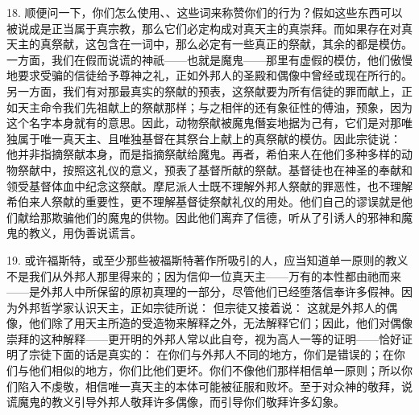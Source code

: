 18. 顺便问一下，你们怎么使用、、这些词来称赞你们的行为？假如这些东西可以被说成是正当属于真宗教，那么它们必定构成对真天主的真崇拜。而如果存在对真天主的真祭献，这包含在一词中，那么必定有一些真正的祭献，其余的都是模仿。一方面，我们在假而说谎的神祇——也就是魔鬼——那里有虚假的模仿，他们傲慢地要求受骗的信徒给予尊神之礼，正如外邦人的圣殿和偶像中曾经或现在所行的。另一方面，我们有对那最真实的祭献的预表，这祭献要为所有信徒的罪而献上，正如天主命令我们先祖献上的祭献那样；与之相伴的还有象征性的傅油，预象，因为这个名字本身就有的意思。因此，动物祭献被魔鬼僭妄地据为己有，它们是对那唯独属于唯一真天主、且唯独基督在其祭台上献上的真祭献的模仿。因此宗徒说：  他并非指摘祭献本身，而是指摘祭献给魔鬼。再者，希伯来人在他们多种多样的动物祭献中，按照这礼仪的意义，预表了基督所献的祭献。基督徒也在神圣的奉献和领受基督体血中纪念这祭献。摩尼派人士既不理解外邦人祭献的罪恶性，也不理解希伯来人祭献的重要性，更不理解基督徒祭献礼仪的用处。他们自己的谬误就是他们献给那欺骗他们的魔鬼的供物。因此他们离弃了信德，听从了引诱人的邪神和魔鬼的教义，用伪善说谎言。\par

19. 或许福斯特，或至少那些被福斯特著作所吸引的人，应当知道单一原则的教义不是我们从外邦人那里得来的；因为信仰一位真天主——万有的本性都由祂而来——是外邦人中所保留的原初真理的一部分，尽管他们已经堕落信奉许多假神。因为外邦哲学家认识天主，正如宗徒所说：  但宗徒又接着说：  这就是外邦人的偶像，他们除了用天主所造的受造物来解释之外，无法解释它们；因此，他们对偶像崇拜的这种解释——更开明的外邦人常以此自夸，视为高人一等的证明——恰好证明了宗徒下面的话是真实的： 在你们与外邦人不同的地方，你们是错误的；在你们与他们相似的地方，你们比他们更坏。你们不像他们那样相信单一原则；所以你们陷入不虔敬，相信唯一真天主的本体可能被征服和败坏。至于对众神的敬拜，说谎魔鬼的教义引导外邦人敬拜许多偶像，而引导你们敬拜许多幻象。\par


